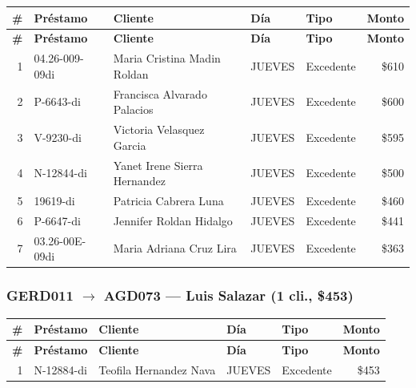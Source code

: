 \documentclass[11pt,a4paper]{article}
\newcommand{\money}[1]{\$\num{#1}}
\begin{document}
\begin{center}
\renewcommand{\arraystretch}{1.1}
\footnotesize
\begin{longtable}{rlp{5.5cm}llr}
\toprule
\textbf{\#} & \textbf{Pr\'estamo} & \textbf{Cliente} & \textbf{D\'ia} & \textbf{Tipo} & \textbf{Monto} \\
\midrule
\endfirsthead
\toprule
\textbf{\#} & \textbf{Pr\'estamo} & \textbf{Cliente} & \textbf{D\'ia} & \textbf{Tipo} & \textbf{Monto} \\
\midrule
\endhead
1 & 04.26-009-09di & Maria Cristina Madin Roldan & JUEVES & Excedente & \money{610} \\
2 & P-6643-di & Francisca Alvarado Palacios & JUEVES & Excedente & \money{600} \\
3 & V-9230-di & Victoria Velasquez Garcia & JUEVES & Excedente & \money{595} \\
4 & N-12844-di & Yanet Irene Sierra Hernandez & JUEVES & Excedente & \money{500} \\
5 & 19619-di & Patricia Cabrera Luna & JUEVES & Excedente & \money{460} \\
6 & P-6647-di & Jennifer Roldan Hidalgo & JUEVES & Excedente & \money{441} \\
7 & 03.26-00E-09di & Maria Adriana Cruz Lira & JUEVES & Excedente & \money{363} \\

\bottomrule
\end{longtable}
\end{center}
\subsubsection{GERD011 $\rightarrow$ AGD073 --- Luis Salazar (1 cli., \money{453})}


\begin{center}
\renewcommand{\arraystretch}{1.1}
\footnotesize
\begin{longtable}{rlp{5.5cm}llr}
\toprule
\textbf{\#} & \textbf{Pr\'estamo} & \textbf{Cliente} & \textbf{D\'ia} & \textbf{Tipo} & \textbf{Monto} \\
\midrule
\endfirsthead
\toprule
\textbf{\#} & \textbf{Pr\'estamo} & \textbf{Cliente} & \textbf{D\'ia} & \textbf{Tipo} & \textbf{Monto} \\
\midrule
\endhead
1 & N-12884-di & Teofila Hernandez Nava & JUEVES & Excedente & \money{453} \\

\bottomrule
\end{longtable}
\end{center}
\end{document}
